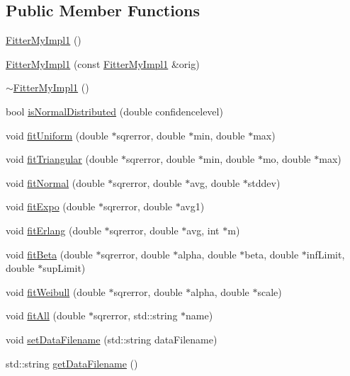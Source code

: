 \subsection*{Public Member Functions}
\begin{DoxyCompactItemize}
\item 
\hyperlink{class_fitter_my_impl1_a9047919931ab66d267e9c91a378e7413}{Fitter\-My\-Impl1} ()
\item 
\hyperlink{class_fitter_my_impl1_a240ccdcb7aef045f1a31b554b990593a}{Fitter\-My\-Impl1} (const \hyperlink{class_fitter_my_impl1}{Fitter\-My\-Impl1} \&orig)
\item 
\hyperlink{class_fitter_my_impl1_a7097d3bca5ecc73393b54ef07973b841}{$\sim$\-Fitter\-My\-Impl1} ()
\item 
bool \hyperlink{class_fitter_my_impl1_abcb39383a71603a570d1e2c396c6b7ca}{is\-Normal\-Distributed} (double confidencelevel)
\item 
void \hyperlink{class_fitter_my_impl1_adde8080641759eaea1d247d3c7436b1d}{fit\-Uniform} (double $\ast$sqrerror, double $\ast$min, double $\ast$max)
\item 
void \hyperlink{class_fitter_my_impl1_a41a9b0e578a67a5bb33bb248388f5cb4}{fit\-Triangular} (double $\ast$sqrerror, double $\ast$min, double $\ast$mo, double $\ast$max)
\item 
void \hyperlink{class_fitter_my_impl1_a42ad0944837a2921674289c2ac264176}{fit\-Normal} (double $\ast$sqrerror, double $\ast$avg, double $\ast$stddev)
\item 
void \hyperlink{class_fitter_my_impl1_aba4920314b8dcf17ee9d4f6d19ea48b2}{fit\-Expo} (double $\ast$sqrerror, double $\ast$avg1)
\item 
void \hyperlink{class_fitter_my_impl1_aa64e8edaebe913f32b69ca5566702ce4}{fit\-Erlang} (double $\ast$sqrerror, double $\ast$avg, int $\ast$m)
\item 
void \hyperlink{class_fitter_my_impl1_a8422a27621e54042f3f9b59af889307a}{fit\-Beta} (double $\ast$sqrerror, double $\ast$alpha, double $\ast$beta, double $\ast$inf\-Limit, double $\ast$sup\-Limit)
\item 
void \hyperlink{class_fitter_my_impl1_a3b44b3b510c446f44b74b810e262c531}{fit\-Weibull} (double $\ast$sqrerror, double $\ast$alpha, double $\ast$scale)
\item 
void \hyperlink{class_fitter_my_impl1_ad10f9269396cb86f2230edf652242f23}{fit\-All} (double $\ast$sqrerror, std\-::string $\ast$name)
\item 
void \hyperlink{class_fitter_my_impl1_a02c8f65838daa1f086586561aea6e4da}{set\-Data\-Filename} (std\-::string data\-Filename)
\item 
std\-::string \hyperlink{class_fitter_my_impl1_a7a9ea5c0a702ba2880dd3ed652f92030}{get\-Data\-Filename} ()
\end{DoxyCompactItemize}


